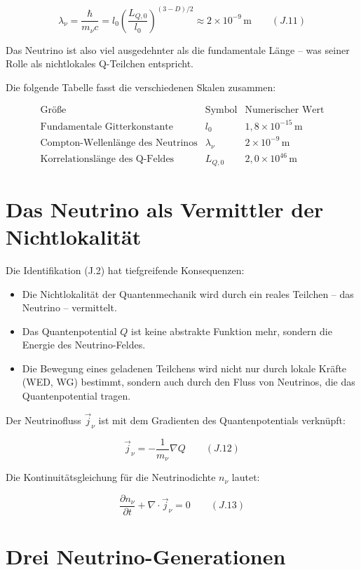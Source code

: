 \[
\lambda_\nu = \frac{\hbar}{m_\nu c} = l_0 \left( \frac{L_{Q,0}}{l_0} \right)^{(3-D)/2} 
\approx 2 \times 10^{-9} \, \text{m} \qquad (J.11)
\]

Das Neutrino ist also viel ausgedehnter als die fundamentale Länge – was seiner Rolle als nichtlokales Q-Teilchen entspricht.

Die folgende Tabelle fasst die verschiedenen Skalen zusammen:

\[
\begin{array}{l|c|c}
\text{Größe} & \text{Symbol} & \text{Numerischer Wert} \\
\hline
\text{Fundamentale Gitterkonstante} & l_0 & 1,8 \times 10^{-15} \, \text{m} \\
\text{Compton-Wellenlänge des Neutrinos} & \lambda_\nu & 2 \times 10^{-9} \, \text{m} \\
\text{Korrelationslänge des Q-Feldes} & L_{Q,0} & 2{,}0 \times 10^{46} \, \text{m}
\end{array}
\]

\section{Das Neutrino als Vermittler der Nichtlokalität}
\label{app:neutrino_oszillation_nichtlokalitaet}

Die Identifikation (J.2) hat tiefgreifende Konsequenzen:
\begin{itemize}
    \item Die Nichtlokalität der Quantenmechanik wird durch ein reales Teilchen – das Neutrino – vermittelt.
    \item Das Quantenpotential \( Q \) ist keine abstrakte Funktion mehr, sondern die Energie des Neutrino-Feldes.
    \item Die Bewegung eines geladenen Teilchens wird nicht nur durch lokale Kräfte (WED, WG) bestimmt, sondern auch durch den Fluss von Neutrinos, die das Quantenpotential tragen.
\end{itemize}

Der Neutrinofluss \( \vec{j}_{\nu} \) ist mit dem Gradienten des Quantenpotentials verknüpft:

\[
\vec{j}_{\nu} = -\frac{1}{m_{\nu}} \nabla Q \qquad (J.12)
\]

Die Kontinuitätsgleichung für die Neutrinodichte \( n_{\nu} \) lautet:

\[
\frac{\partial n_{\nu}}{\partial t} + \nabla \cdot \vec{j}_{\nu} = 0 \qquad (J.13)
\]

\section{Drei Neutrino-Generationen}
\label{app:neutrino_oszillation_generationen}

